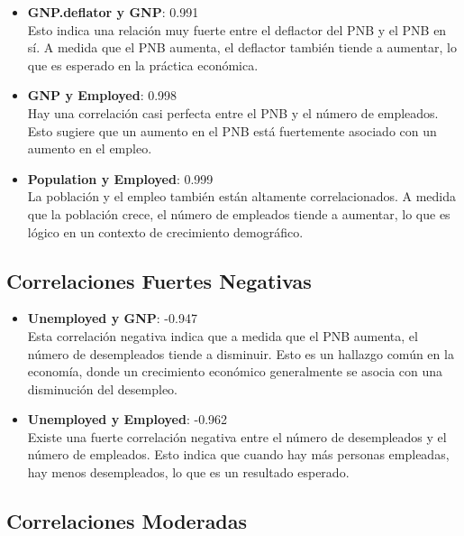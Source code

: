 \documentclass{article}
\begin{document}
\begin{itemize}
    \item \textbf{GNP.deflator y GNP}: 0.991\\
    Esto indica una relación muy fuerte entre el deflactor del PNB y el PNB en sí. A medida que el PNB aumenta, el deflactor también tiende a aumentar, lo que es esperado en la práctica económica.
    
    \item \textbf{GNP y Employed}: 0.998\\
    Hay una correlación casi perfecta entre el PNB y el número de empleados. Esto sugiere que un aumento en el PNB está fuertemente asociado con un aumento en el empleo.
    
    \item \textbf{Population y Employed}: 0.999\\
    La población y el empleo también están altamente correlacionados. A medida que la población crece, el número de empleados tiende a aumentar, lo que es lógico en un contexto de crecimiento demográfico.
\end{itemize}

\subsection{Correlaciones Fuertes Negativas}

\begin{itemize}
    \item \textbf{Unemployed y GNP}: -0.947\\
    Esta correlación negativa indica que a medida que el PNB aumenta, el número de desempleados tiende a disminuir. Esto es un hallazgo común en la economía, donde un crecimiento económico generalmente se asocia con una disminución del desempleo.
    
    \item \textbf{Unemployed y Employed}: -0.962\\
    Existe una fuerte correlación negativa entre el número de desempleados y el número de empleados. Esto indica que cuando hay más personas empleadas, hay menos desempleados, lo que es un resultado esperado.
\end{itemize}

\subsection{Correlaciones Moderadas}
\end{document}
